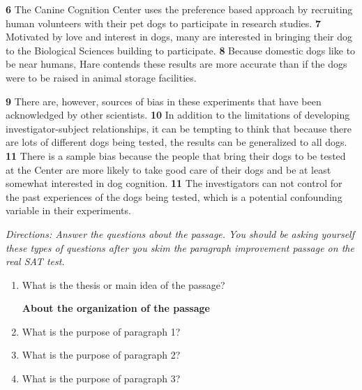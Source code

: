 \indent \textbf{6} The Canine Cognition Center uses the preference based approach by recruiting human volunteers with their pet dogs to participate in research studies. \textbf{7} Motivated by love and interest in dogs, many are interested in bringing their dog to the Biological Sciences building to participate. \textbf{8} Because domestic dogs like to be near humans, Hare contends these results are more accurate than if the dogs were to be raised in animal storage facilities. 

\indent \textbf{9} There are, however, sources of bias in these experiments that have been acknowledged by other scientists. \textbf{10} In addition to the limitations of developing investigator-subject relationships, it can be tempting to think that because there are lots of different dogs being tested, the results can be generalized to all dogs. \textbf{11} There is a sample bias because the people that bring their dogs to be tested at the Center are more likely to take good care of their dogs and be at least somewhat interested in dog cognition. \textbf{11} The investigators can not control for the past experiences of the dogs being tested, which is a potential confounding variable in their experiments. 

\textit{Directions: Answer the questions about the passage. You should be asking yourself these types of questions after you skim the paragraph improvement passage on the real SAT test.}

\begin{enumerate}
\item What is the thesis or main idea of the passage? \hrulefill

\bigskip
\textbf{About the organization of the passage}
\item What is the purpose of paragraph 1? \hrulefill

\bigskip
\item What is the purpose of paragraph 2? \hrulefill

\bigskip
\item What is the purpose of paragraph 3? \hrulefill

\end{enumerate}


